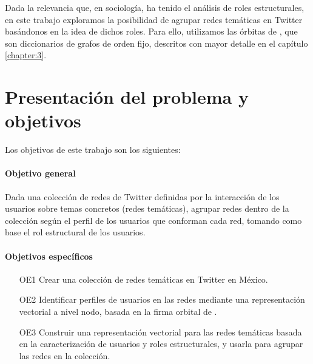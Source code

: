 Dada la relevancia que, en sociología, ha tenido el análisis de roles estructurales, en este trabajo exploramos la posibilidad de agrupar redes temáticas en Twitter basándonos en la idea de dichos roles. Para ello, utilizamos las órbitas de \graphlets, que son diccionarios de grafos de orden fijo, descritos con mayor detalle en el capítulo \ref{chapter:3}.

\section{Presentación del problema y objetivos}
\label{sec:intro:motivación}

Los objetivos de este trabajo son los siguientes: 

\paragraph{Objetivo general}
Dada una colección de redes de Twitter definidas por la interacción de los usuarios sobre temas concretos (redes temáticas), agrupar redes dentro de la colección según el perfil de los usuarios que conforman cada red, tomando como base el rol estructural de los usuarios.

\paragraph{Objetivos específicos}


\begin{itemize}
    \item[OE1] Crear una colección de redes temáticas en Twitter en México.
    \item[OE2] Identificar perfiles de usuarios en las redes mediante una representación vectorial a nivel nodo, basada en la firma orbital de \graphlets. 
    \item[OE3] Construir una representación vectorial para las redes temáticas basada en la caracterización de usuarios y roles estructurales, y usarla para agrupar las redes en la colección.
\end{itemize}

